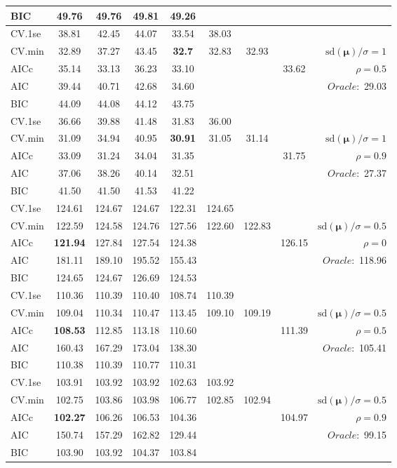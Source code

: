 \begin{table}
\begin{center}
\begin{tabular}{l*{7}{c}|r}
BIC & 49.76 & 49.76 & 49.81 & 49.26 & & & &  \\
 \hline 
CV.1se & 38.81 & 42.45 & 44.07 & 33.54 & 38.03 & & & \\
CV.min & 32.89 & 37.27 & 43.45 & {\bf 32.7} & 32.83 & 32.93 & & $\mathrm{sd}(\mathbf{\mu})/\sigma=1$ \\
AICc & 35.14 & 33.13 & 36.23 & 33.10 & & & 33.62 &  $\rho=0.5$ \\
AIC & 39.44 & 40.71 & 42.68 & 34.60 & & & &  \multirow{2}{*}{$Oracle: $ 29.03} \\
BIC & 44.09 & 44.08 & 44.12 & 43.75 & & & &  \\
 \hline 
CV.1se & 36.66 & 39.88 & 41.48 & 31.83 & 36.00 & & & \\
CV.min & 31.09 & 34.94 & 40.95 & {\bf 30.91} & 31.05 & 31.14 & & $\mathrm{sd}(\mathbf{\mu})/\sigma=1$ \\
AICc & 33.09 & 31.24 & 34.04 & 31.35 & & & 31.75 &  $\rho=0.9$ \\
AIC & 37.06 & 38.26 & 40.14 & 32.51 & & & &  \multirow{2}{*}{$Oracle: $ 27.37} \\
BIC & 41.50 & 41.50 & 41.53 & 41.22 & & & &  \\
 \hline 
CV.1se & 124.61 & 124.67 & 124.67 & 122.31 & 124.65 & & & \\
CV.min & 122.59 & 124.58 & 124.76 & 127.56 & 122.60 & 122.83 & & $\mathrm{sd}(\mathbf{\mu})/\sigma=0.5$ \\
AICc & {\bf 121.94} & 127.84 & 127.54 & 124.38 & & & 126.15 &  $\rho=0$ \\
AIC & 181.11 & 189.10 & 195.52 & 155.43 & & & &  \multirow{2}{*}{$Oracle: $ 118.96} \\
BIC & 124.65 & 124.67 & 126.69 & 124.53 & & & &  \\
 \hline 
CV.1se & 110.36 & 110.39 & 110.40 & 108.74 & 110.39 & & & \\
CV.min & 109.04 & 110.34 & 110.47 & 113.45 & 109.10 & 109.19 & & $\mathrm{sd}(\mathbf{\mu})/\sigma=0.5$ \\
AICc & {\bf 108.53} & 112.85 & 113.18 & 110.60 & & & 111.39 &  $\rho=0.5$ \\
AIC & 160.43 & 167.29 & 173.04 & 138.30 & & & &  \multirow{2}{*}{$Oracle: $ 105.41} \\
BIC & 110.38 & 110.39 & 110.77 & 110.31 & & & &  \\
 \hline 
CV.1se & 103.91 & 103.92 & 103.92 & 102.63 & 103.92 & & & \\
CV.min & 102.75 & 103.86 & 103.98 & 106.77 & 102.85 & 102.94 & & $\mathrm{sd}(\mathbf{\mu})/\sigma=0.5$ \\
AICc & {\bf 102.27} & 106.26 & 106.53 & 104.36 & & & 104.97 &  $\rho=0.9$ \\
AIC & 150.74 & 157.29 & 162.82 & 129.44 & & & &  \multirow{2}{*}{$Oracle: $ 99.15} \\
BIC & 103.90 & 103.92 & 104.37 & 103.84 & & & &  \\
 \hline 
\end{tabular}
\end{center}
\vspace{-1cm}
\end{table}




